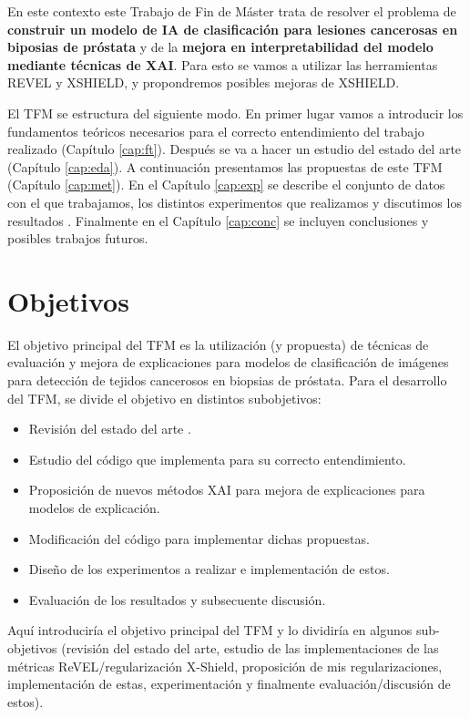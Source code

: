 En este contexto este Trabajo de Fin de Máster trata de resolver el problema de \textbf{construir un modelo de IA de clasificación para lesiones cancerosas en biposias de próstata} y de la \textbf{mejora en interpretabilidad del modelo mediante técnicas de XAI}. Para esto se vamos a utilizar las herramientas REVEL y XSHIELD, y propondremos posibles mejoras de XSHIELD.


El TFM se estructura del siguiente modo. En primer lugar vamos a introducir los fundamentos teóricos necesarios para el correcto entendimiento del trabajo realizado (Capítulo \ref{cap:ft}). Después se va a hacer un estudio del estado del arte (Capítulo \ref{cap:eda}). A continuación presentamos las propuestas de este TFM (Capítulo \ref{cap:met}). En el Capítulo \ref{cap:exp} se describe el conjunto de datos con el que trabajamos, los distintos experimentos que realizamos y discutimos los resultados . Finalmente en el Capítulo \ref{cap:conc} se incluyen conclusiones y posibles trabajos futuros.


\section{Objetivos}

El objetivo principal del TFM es la utilización (y propuesta) de técnicas de evaluación y mejora de explicaciones  para modelos de clasificación de imágenes para detección de tejidos cancerosos en biopsias de próstata. Para el desarrollo del TFM, se divide el objetivo en distintos subobjetivos:

\begin{itemize}
\item Revisión del estado del arte .
\item Estudio del código que implementa \cite{REVEL, XSHIELD} para su correcto entendimiento.
\item Proposición de nuevos métodos XAI para mejora de explicaciones para modelos de explicación.
\item Modificación del código para implementar dichas propuestas.
\item Diseño de los experimentos a realizar e implementación de estos.
\item Evaluación de los resultados y subsecuente discusión.
\end{itemize}

Aquí introduciría el objetivo principal del TFM y lo dividiría en algunos sub-objetivos (revisión del estado del arte, estudio de las implementaciones de las métricas ReVEL/regularización X-Shield, proposición de mis regularizaciones, implementación de estas, experimentación y finalmente evaluación/discusión de estos). 


